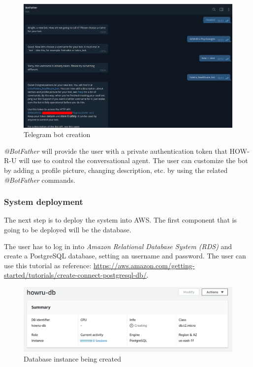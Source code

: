 \documentclass[12pt,english]{article}
\begin{document}
\begin{figure}[H]
  \centering
  \includegraphics[width=\textwidth]{bot_creation.png}
  \caption{Telegram bot creation}
\end{figure}

\emph{@BotFather} will provide the user with a private authentication token that HOW-R-U will use to control the conversational agent. The user can customize the bot by adding a profile picture, changing description, etc. by using the related \emph{@BotFather} commands.

\subsubsection{System deployment}

The next step is to deploy the system into AWS. The first component that is going to be deployed will be the database.

The user has to log in into \emph{Amazon Relational Database System (RDS)} and create a PostgreSQL database, setting an username and password. The user can use this tutorial as reference: \href{https://aws.amazon.com/getting-started/tutorials/create-connect-postgresql-db/}{https://aws.amazon.com/getting-started/tutorials/create-connect-postgresql-db/}.


\begin{figure}[H]
  \centering
  \includegraphics[width=\textwidth]{db_creation.png}
  \caption{Database instance being created}
\end{figure}
\end{document}
